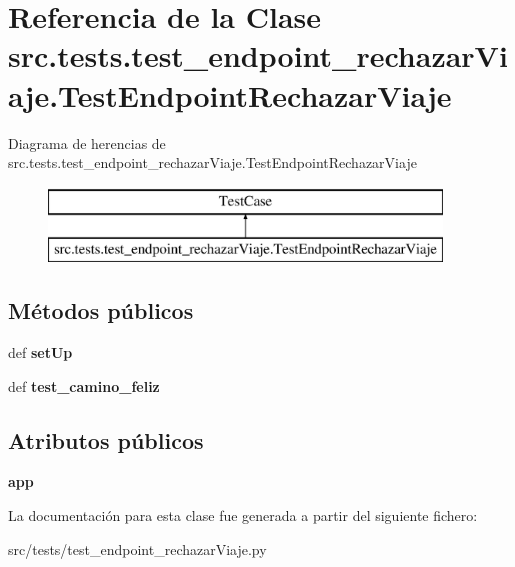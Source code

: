 \hypertarget{classsrc_1_1tests_1_1test__endpoint__rechazar_viaje_1_1_test_endpoint_rechazar_viaje}{\section{Referencia de la Clase src.\-tests.\-test\-\_\-endpoint\-\_\-rechazar\-Viaje.\-Test\-Endpoint\-Rechazar\-Viaje}
\label{classsrc_1_1tests_1_1test__endpoint__rechazar_viaje_1_1_test_endpoint_rechazar_viaje}
}
Diagrama de herencias de src.\-tests.\-test\-\_\-endpoint\-\_\-rechazar\-Viaje.\-Test\-Endpoint\-Rechazar\-Viaje\begin{figure}[H]
\begin{center}
\leavevmode
\includegraphics[height=2.000000cm]{classsrc_1_1tests_1_1test__endpoint__rechazar_viaje_1_1_test_endpoint_rechazar_viaje}
\end{center}
\end{figure}
\subsection*{Métodos públicos}
\begin{DoxyCompactItemize}
\item 
\hypertarget{classsrc_1_1tests_1_1test__endpoint__rechazar_viaje_1_1_test_endpoint_rechazar_viaje_a9e9bc78853387da2a947dae31f0a3524}{def {\bfseries set\-Up}}\label{classsrc_1_1tests_1_1test__endpoint__rechazar_viaje_1_1_test_endpoint_rechazar_viaje_a9e9bc78853387da2a947dae31f0a3524}

\item 
\hypertarget{classsrc_1_1tests_1_1test__endpoint__rechazar_viaje_1_1_test_endpoint_rechazar_viaje_abe31636f93070adb90d415422cc36c3b}{def {\bfseries test\-\_\-camino\-\_\-feliz}}\label{classsrc_1_1tests_1_1test__endpoint__rechazar_viaje_1_1_test_endpoint_rechazar_viaje_abe31636f93070adb90d415422cc36c3b}

\end{DoxyCompactItemize}
\subsection*{Atributos públicos}
\begin{DoxyCompactItemize}
\item 
\hypertarget{classsrc_1_1tests_1_1test__endpoint__rechazar_viaje_1_1_test_endpoint_rechazar_viaje_a027ffd6ab488c138db0fd2436143fb9d}{{\bfseries app}}\label{classsrc_1_1tests_1_1test__endpoint__rechazar_viaje_1_1_test_endpoint_rechazar_viaje_a027ffd6ab488c138db0fd2436143fb9d}

\end{DoxyCompactItemize}


La documentación para esta clase fue generada a partir del siguiente fichero\-:\begin{DoxyCompactItemize}
\item 
src/tests/test\-\_\-endpoint\-\_\-rechazar\-Viaje.\-py\end{DoxyCompactItemize}
